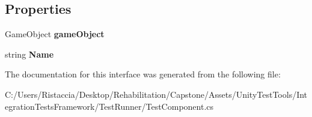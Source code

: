 \subsection*{Properties}
\begin{DoxyCompactItemize}
\item 
\mbox{\label{interface_unity_test_1_1_i_test_component_a7c325344730aa79615fb600727a4b916}} 
Game\+Object {\bfseries game\+Object}
\item 
\mbox{\label{interface_unity_test_1_1_i_test_component_a2ffdffb08922c68e2127f27d607f29a8}} 
string {\bfseries Name}
\end{DoxyCompactItemize}


The documentation for this interface was generated from the following file\+:\begin{DoxyCompactItemize}
\item 
C\+:/\+Users/\+Ristaccia/\+Desktop/\+Rehabilitation/\+Capstone/\+Assets/\+Unity\+Test\+Tools/\+Integration\+Tests\+Framework/\+Test\+Runner/Test\+Component.\+cs\end{DoxyCompactItemize}
